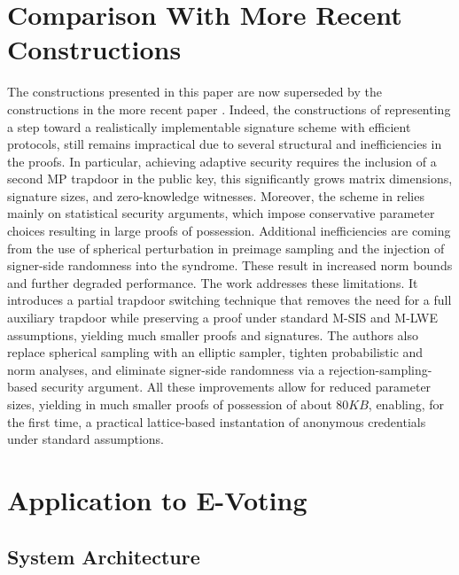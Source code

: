 \documentclass[a4paper]{article}
\begin{document}
\section{Comparison With More Recent Constructions}
\label{recentConst}
The constructions presented in this paper are now superseded by the constructions in the more recent paper \cite{newPaper}. Indeed, the constructions of \cite{mainPaper} representing a step toward a
realistically implementable signature scheme with efficient protocols, still remains impractical due to several structural and inefficiencies in the proofs. In particular, achieving adaptive security requires
the inclusion of a second MP trapdoor in the public key, this significantly grows matrix dimensions, signature sizes, and zero-knowledge witnesses. Moreover, the scheme in \cite{mainPaper} relies mainly on statistical 
security arguments, which impose conservative parameter choices resulting in large proofs of possession. Additional inefficiencies are coming from the use of spherical perturbation in preimage sampling and the injection 
of signer-side randomness into the syndrome. These result in increased norm bounds and further degraded performance. The work \cite{newPaper} addresses these limitations. It introduces 
a partial trapdoor switching technique that removes the need for a full auxiliary trapdoor while preserving a proof under standard M-SIS and M-LWE assumptions, yielding much smaller proofs and signatures. 
The authors also replace spherical sampling with an elliptic sampler, tighten probabilistic and norm analyses, and eliminate signer-side randomness via a rejection-sampling-based security argument. 
All these improvements allow for reduced parameter sizes, yielding in much smaller proofs of possession of about $80KB$, enabling, for the first time, a practical lattice-based instantation of anonymous 
credentials under standard assumptions. 


\section{Application to E-Voting}

\subsection{System Architecture}
\end{document}
